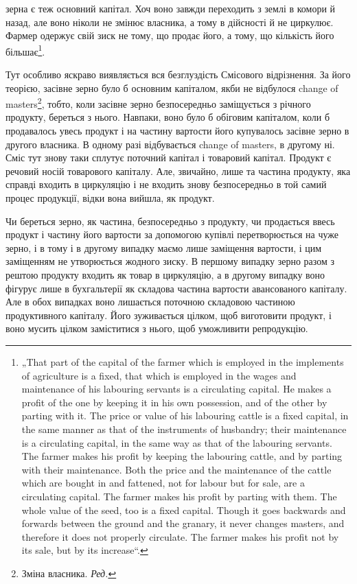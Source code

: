 зерна є теж основний капітал. Хоч воно завжди переходить з землі
в комори й назад, але воно ніколи не змінює власника, а тому в
дійсності й не циркулює. Фармер одержує свій зиск не тому, що продає
його, а тому, що кількість його більшає\footnote*{
„That part of the capital of the farmer which is employed in the implements
of agriculture is a fixed, that which is employed in the wages and maintenance of
his labouring servants is a circulating capital. He makes a profit of the one by
keeping it in his own possession, and of the other by parting with it. The price or
value of his labouring cattle is a fixed capital, in the same manner as that of the
instruments of husbandry; their maintenance is a circulating capital, in the same way
as that of the labouring servants. The farmer makes his profit by keeping the labouring
cattle, and by parting with their maintenance. Both the price and the maintenance
of the cattle which are bought in and fattened, not for labour but for sale,
are a circulating capital. The farmer makes his profit by parting with them. The whole
value of the seed, too is a fixed capital. Though it goes backwards and
forwards between the ground and the granary, it never changes masters, and therefore
it does not properly circulate. The farmer makes his profit not by its sale, but
by its increase“.
}.

Тут особливо яскраво виявляється вся безглуздість Смісового відрізнення.
За його теорією, засівне зерно було б основним капіталом, якби не
відбулося change of masters\footnote*{
Зміна власника. \emph{Ред.}
}, тобто, коли засівне зерно безпосередньо
заміщується з річного продукту, береться з нього. Навпаки,
воно було б обіговим капіталом, коли б продавалось увесь продукт і на
частину вартости його купувалось засівне зерно в другого власника. В
одному разі відбувається change of masters, в другому ні. Сміс тут знову
таки сплутує поточний капітал і товаровий капітал. Продукт є речовий
носій товарового капіталу. Але, звичайно, лише та частина продукту,
яка справді входить в циркуляцію і не входить знову безпосередньо в
той самий процес продукції, відки вона вийшла, як продукт.

Чи береться зерно, як частина, безпосередньо з продукту, чи продається
ввесь продукт і частину його вартости за допомогою купівлі перетворюється
на чуже зерно, і в тому і в другому випадку маємо лише заміщення
вартости, і цим заміщенням не утворюється жодного зиску. В
першому випадку зерно разом з рештою продукту входить як товар в
циркуляцію, а в другому випадку воно фігурує лише в бухгальтерії як
складова частина вартости авансованого капіталу. Але в обох випадках
воно лишається поточною складовою частиною продуктивного капіталу.
Його зуживається цілком, щоб виготовити продукт, і воно мусить цілком
заміститися з нього, щоб уможливити репродукцію.

